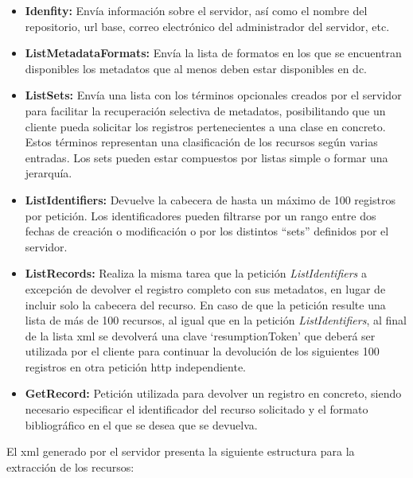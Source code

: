 \begin{itemize}
	\item \textbf{Idenfity:} Envía información sobre el servidor, así como el nombre del repositorio, \acrshort{url} base, correo electrónico del administrador del servidor, etc.
	\item \textbf{ListMetadataFormats:} Envía la lista de formatos en los que se encuentran disponibles los metadatos que al menos deben estar disponibles en \acrshort{dc}.
	\item \textbf{ListSets:} Envía una lista con los términos opcionales creados por el servidor para facilitar la recuperación selectiva de metadatos, posibilitando que un cliente pueda solicitar los registros pertenecientes a una clase en concreto. Estos términos representan una clasificación de los recursos según varias entradas. Los sets pueden estar compuestos por listas simple o formar una jerarquía.
	\item \textbf{ListIdentifiers: } Devuelve la cabecera de hasta un máximo de 100 registros por petición. Los identificadores pueden filtrarse por un rango entre dos fechas de creación o modificación o por los distintos ``sets'' definidos por el servidor.
	\item \textbf{ListRecords: } Realiza la misma tarea que la petición \textit{ListIdentifiers} a excepción de devolver el registro completo con sus metadatos, en lugar de incluir solo la cabecera del recurso. En caso de que la petición resulte una lista de más de 100 recursos, al igual que en la petición \textit{ListIdentifiers}, al final de la lista \acrshort{xml} se devolverá una clave `resumptionToken' que deberá ser utilizada por el cliente para continuar la devolución de los siguientes 100 registros en otra petición \acrshort{http} independiente.
	\item \textbf{GetRecord: } Petición utilizada para devolver un registro en concreto, siendo necesario especificar el identificador del recurso solicitado y el formato bibliográfico en el que se desea que se devuelva.
\end{itemize}

\clearpage



El \acrshort{xml} generado por el servidor presenta la siguiente estructura para la extracción de los recursos:

